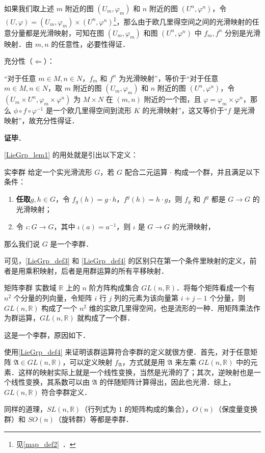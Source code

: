 如果我们取上述 $m$ 附近的图 $(U_m, \varphi_m)$ 和 $n$ 附近的图 $(U^n, \varphi^n)$，令 $(U, \varphi)=(U_m, \varphi_m)\times(U^n, \varphi^n)$\footnote{见\autoref{map_def2}~．}，那么由于欧几里得空间之间的光滑映射的任意分量都是光滑映射，可知在图 $(U_m, \varphi_m)$ 和图 $(U^n, \varphi^n)$ 中 $f_m, f^n$ 分别是光滑映射．由 $m, n$ 的任意性，必要性得证．

充分性（$\Leftarrow$）：

“对于任意 $m\in M, n\in N$，$f_m$ 和 $f^n$ 为光滑映射”，等价于“对于任意 $m\in M, n\in N$，取 $m$ 附近的图 $(U_m, \varphi_m)$ 和 $n$ 附近的图 $(U^n, \varphi^n)$，令 $(U_m\times U^n, \varphi_m\times\varphi^n)$ 为 $M\times N$ 在 $(m, n)$ 附近的一个图，且 $\varphi=\varphi_m\times\varphi^n$，那么 $\phi\circ f\circ\varphi^{-1}$ 是一个欧几里得空间到流形 $K$ 的光滑映射”，这又等价于“$f$ 是光滑映射”，故充分性得证．

\textbf{证毕}．

\autoref{LieGrp_lem1} 的用处就是引出以下定义：

\begin{definition}{实李群}\label{LieGrp_def4}
给定一个实光滑流形 $G$，若 $G$ 配合二元运算 $\cdot$ 构成一个群，并且满足以下条件：
\begin{enumerate}
\item \textbf{任取}$g, h\in G$，令 $f_g(h)=g\cdot h$，$f^g(h)=h\cdot g$，则 $f_g$ 和 $f^g$ 都是 $G\to G$ 的光滑映射；
\item 令 $\iota:G\to G$，其中 $\iota(a)=a^{-1}$，则 $\iota$ 是 $G\to G$ 的光滑映射，
\end{enumerate}
那么我们说 $G$ 是一个李群．
\end{definition}

可见，\autoref{LieGrp_def3} 和 \autoref{LieGrp_def4} 的区别只在第一个条件里映射的定义，前者是用乘积映射，后者是用群运算的所有平移映射．

\begin{example}{矩阵李群}
实数域 $\mathbb{R}$ 上的 $n$ 阶方阵构成集合 $GL(n, \mathbb{R})$．将每个矩阵看成一个有 $n^2$ 个分量的列向量，令矩阵 $i$ 行 $j$ 列的元素为该向量第 $i+j-1$ 个分量，则 $GL(n, \mathbb{R})$ 构成了一个 $n^2$ 维的实欧几里得空间，也是流形的一种．用矩阵乘法作为群运算，$GL(n, \mathbb{R})$ 就构成了一个群．

这是一个李群，原因如下．

使用\autoref{LieGrp_def4} 来证明该群运算符合李群的定义就很方便．首先，对于任意矩阵 $\mathfrak{A}\in GL(n, \mathbb{R})$，可以定义映射 $f_\mathfrak{A}$，方式就是用 $\mathfrak{A}$ 来左乘 $GL(n, \mathbb{R})$ 中的元素．这样的映射实际上就是一个线性变换，当然是光滑的了；其次，逆映射也是一个线性变换，其系数可以由 $\mathfrak{A}$ 的伴随矩阵计算得出，因此也光滑．综上，$GL(n, \mathbb{R})$ 符合李群定义．

同样的道理，$SL(n, \mathbb{R})$（行列式为 $1$ 的矩阵构成的集合），$O(n)$（保度量变换群）和 $SO(n)$（旋转群）等都是李群．
\end{example}


